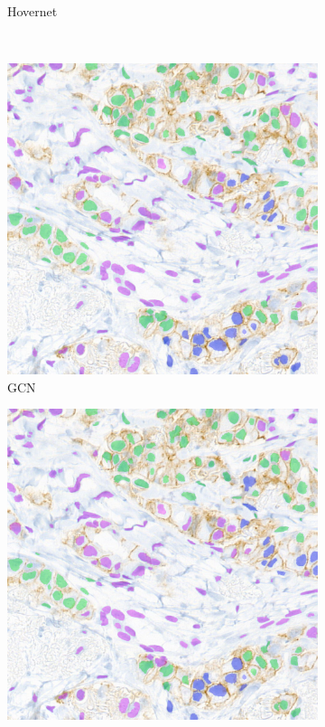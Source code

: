 \begin{figure}[H]
\begin{subfigure}[b]{0.45\textwidth}
    \caption{Hovernet}
    \label{fig:breast-hov3}
  \end{subfigure}
  \\
  \begin{subfigure}[b]{0.45\textwidth}
    \includegraphics[width=\textwidth]{imgs/qual/breast/gcn-full3.png}
    \caption{GCN}
    \label{fig:breast-gcn3}
  \end{subfigure}
  \hfill
  \begin{subfigure}[b]{0.45\textwidth}
    \includegraphics[width=\textwidth]{imgs/qual/breast/no-morph3.png}

\end{subfigure}
\end{figure}
